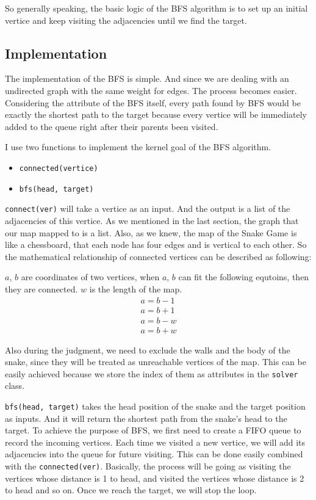 \documentclass[12pt]{article}
\begin{document}
So generally speaking, the basic logic of the BFS algorithm is to set up an initial vertice and keep visiting the adjacencies until we find the target. 

\subsection{Implementation}
The implementation of the BFS is simple. And since we are dealing with an undirected graph with the same weight for edges. The process becomes easier. Considering the attribute of the BFS itself, every path found by BFS would be exactly the shortest path to the target because every vertice will be immediately added to the queue right after their parents been visited.

I use two functions to implement the kernel goal of the BFS algorithm. 
\begin{itemize}
    \item \verb|connected(vertice)|
    \item \verb|bfs(head, target)|
\end{itemize}

\verb|connect(ver)| will take a vertice as an input. And the output is a list of the adjacencies of this vertice. As we mentioned in the last section, the graph that our map mapped to is a list. Also, as we knew, the map of the Snake Game is like a chessboard, that each node has four edges and is vertical to each other. So the mathematical relationship of connected vertices can be described as following:

$a$, $b$ are coordinates of two vertices, when $a$, $b$ can fit the following equtoins, then they
are connected. $w$ is the length of the map.
\begin{eqnarray}
        a = b - 1 \\
        a = b + 1 \\
        a = b - w \\
        a = b + w 
\end{eqnarray}

Also during the judgment, we need to exclude the walls and the body of the snake, since they 
will be treated as unreachable vertices of the map. This can be easily achieved because we 
store the index of them as attributes in the \verb|solver| class.

\verb|bfs(head, target)| takes the head position of the snake and the target position as 
inputs. And it will return the shortest path from the snake's head to the target. 
To achieve the purpose of BFS, we first need to create a FIFO queue to record the incoming 
vertices. Each time we visited a new vertice, we will add its adjacencies into the queue for 
future visiting. This can be done easily combined with the \verb|connected(ver)|. 
Basically, the process will be going as visiting the vertices whose distance is 1 to head, 
and visited the vertices whose distance is 2 to head and so on. Once we reach the target, 
we will stop the loop.
\end{document}
